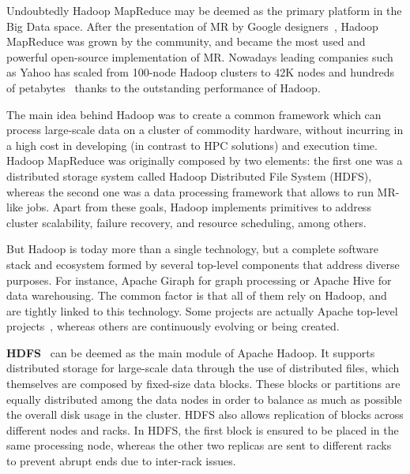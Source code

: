 \documentclass[3p,review]{elsarticle}
\begin{document}
	Undoubtedly Hadoop MapReduce may be deemed as the primary platform in the Big Data space. After the presentation of MR by Google designers~\cite{dean04}, Hadoop MapReduce was grown by the community, and became the most used and powerful open-source implementation of MR. Nowadays leading companies such as Yahoo has scaled from 100-node Hadoop clusters to 42K nodes and hundreds of petabytes~\cite{harris13} thanks to the outstanding performance of Hadoop. 
	
	The main idea behind Hadoop was to create a common framework which can process large-scale data on a cluster of commodity hardware, without incurring in a high cost in developing (in contrast to HPC solutions) and execution time. Hadoop MapReduce was originally composed by two elements: the first one was a distributed storage system called Hadoop Distributed File System (HDFS), whereas the second one was a data processing framework that allows to run MR-like jobs. Apart from these goals, Hadoop implements primitives to address cluster scalability, failure recovery, and resource scheduling, among others.
	
	But Hadoop is today more than a single technology, but a complete software stack and ecosystem formed by several top-level components that address diverse purposes. For instance, Apache Giraph for graph processing or Apache Hive for data warehousing. The common factor is that all of them rely on Hadoop, and are tightly linked to this technology. Some projects are actually Apache top-level projects~\cite{apache}, whereas others are continuously evolving or being created.%
	
	\textbf{HDFS}~\cite{hdfs} can be deemed as the main module of Apache Hadoop. It supports distributed storage for large-scale data through the use of distributed files, which themselves are composed by fixed-size data blocks. These blocks or partitions are equally distributed among the data nodes in order to balance as much as possible the overall disk usage in the cluster. HDFS also allows replication of blocks across different nodes and racks. In HDFS, the first block is ensured to be placed in the same processing node, whereas the other two replicas are sent to different racks to prevent abrupt ends due to inter-rack issues. 
	
\end{document}
